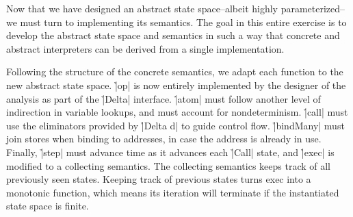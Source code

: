 Now that we have designed an abstract state space--albeit highly
parameterized--we must turn to implementing its semantics.
%
The goal in this entire exercise is to develop the abstract state space and
semantics in such a way that concrete and abstract interpreters can be derived
from a single implementation.


Following the structure of the concrete semantics, we adapt each function to
the new abstract state space.
%
\h|op| is now entirely implemented by the designer of the analysis as part of
the \h|Delta| interface.
%
\h|atom| must follow another level of indirection in variable lookups, and must
account for nondeterminism.
%
%
\h|call| must use the eliminators provided by \h|Delta d| to guide control
flow.
%
%
\h|bindMany| must join stores when binding to addresses, in case the address is
already in use.
%
%
Finally, \h|step| must advance time as it advances each \h|Call| state, and
\h|exec| is modified to a collecting semantics.
%
%
The collecting semantics keeps track of all previously seen states.
%
%
Keeping track of previous states turns exec into a monotonic function, which
means its iteration will terminate if the instantiated state space is finite.
